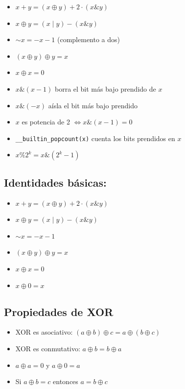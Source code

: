 \documentclass[12pt]{article}
\begin{document}
    \begin{itemize}
        \item $x + y = (x \oplus y) + 2 \cdot (x \& y)$
        \item $x \oplus y = (x \mid y) - (x \& y)$
        \item $\sim x = -x - 1$ \hfill (complemento a dos)
        \item $(x \oplus y) \oplus y = x$
        \item $x \oplus x = 0$
        \item $x \& (x - 1)$ borra el bit más bajo prendido de $x$
        \item $x \& (-x)$ aísla el bit más bajo prendido
        \item $x$ es potencia de 2 $\iff x \& (x - 1) = 0$
        \item \texttt{\_\_builtin\_popcount(x)} cuenta los bits prendidos en $x$
        \item $x \% 2^k = x \& (2^k - 1)$
    \end{itemize}
    \subsection{Identidades b\'asicas:}
        \begin{itemize}
            \item $x + y = (x \oplus y) + 2 \cdot (x \& y)$
            \item $x \oplus y = (x \mid y) - (x \& y)$
            \item $\sim x = -x - 1$
            \item $(x \oplus y) \oplus y = x$
            \item $x \oplus x = 0$
            \item $x \oplus 0 = x$
        \end{itemize}
    \subsection{Propiedades de XOR}
        \begin{itemize}
            \item XOR es asociativo: $(a \oplus b) \oplus c = a \oplus (b \oplus c)$
            \item XOR es conmutativo: $a \oplus b = b \oplus a$
            \item $a \oplus a = 0$ \quad y \quad $a \oplus 0 = a$
            \item Si $a \oplus b = c$ entonces $a = b \oplus c$
        \end{itemize}
\end{document}
